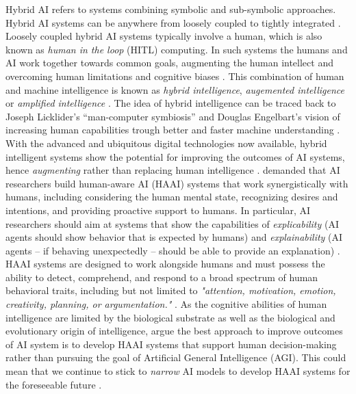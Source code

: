 Hybrid AI refers to systems combining symbolic and sub-symbolic
approaches. Hybrid AI systems can be anywhere from loosely coupled to tightly integrated \citep{garcezNeurosymbolicAI3rd2023}.
Loosely coupled hybrid AI systems typically involve a human, which is also known as \textit{human in the loop} (HITL)
computing. In such systems the humans and AI work together towards common goals, augmenting the human intellect and
overcoming human limitations and cognitive biases \citep{akataResearchAgendaHybrid2020}. This combination of human and machine
intelligence is known as \textit{hybrid intelligence}, \textit{augemented intelligence} or \textit{amplified intelligence}
\citep{schmidtAugmentingHumanIntellect2017,akataResearchAgendaHybrid2020,zhouIntelligenceAugmentationBuilding2021}. The idea of
hybrid intelligence can be traced back to Joseph Licklider's ``man-computer symbiosis'' and Douglas Engelbart's vision of increasing
human capabilities trough better and faster machine understanding \citep[and references cited therein]{schmidtAugmentingHumanIntellect2017}.
With the advanced and ubiquitous digital technologies now available, hybrid intelligent systems show the potential for improving
the outcomes of AI systems,  hence \textit{augmenting} rather than replacing human intelligence \citep{schmidtAugmentingHumanIntellect2017,
akataResearchAgendaHybrid2020}. \cite{kambhampatiChallengesHumanAwareAI2020} demanded that AI researchers build human-aware AI (HAAI)
systems that work synergistically with humans, including considering the human mental state, recognizing desires and intentions,
and providing proactive support to humans. In particular, AI researchers should aim at systems that show the capabilities of
\textit{explicability} (AI agents should show behavior that is expected by humans) and \textit{explainability} (AI agents -- 
if behaving unexpectedly -- should be able to provide an explanation) \citep{kambhampatiChallengesHumanAwareAI2020}.
HAAI systems are designed to work alongside humans and must possess the ability to detect, comprehend, and respond to a
broad spectrum of human behavioral traits, including but not limited to \textit{"attention, motivation, emotion, creativity,
planning, or argumentation."} \citep{kortelingHumanArtificialIntelligence2021}. As the cognitive abilities of human intelligence
are limited by the biological substrate as well as the biological and evolutionary origin of intelligence,
\cite{kortelingHumanArtificialIntelligence2021} argue the best approach to improve outcomes of AI system is to develop
HAAI systems that support human decision-making rather than pursuing the goal of Artificial General Intelligence (AGI).
This could mean that we continue to stick to \textit{narrow} AI models to develop HAAI systems for the foreseeable future
\citep{kortelingHumanArtificialIntelligence2021}.

